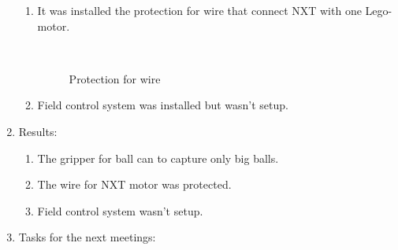 \begin{enumerate}
\begin{enumerate}
		\item It was installed the protection for wire that connect NXT with one Lego-motor.
		\begin{figure}[H] 
			\begin{minipage}[h]{0.2\linewidth}
				\center  
			\end{minipage}
			\begin{minipage}[h]{0.6\linewidth}
				\caption{Protection for wire}
			\end{minipage}
		\end{figure}
		
        \item Field control system was installed but wasn't setup.

	\end{enumerate}
	
	\item Results:
	\begin{enumerate}
		
		\item The gripper for ball can to capture only big balls.
		
		\item The wire for NXT motor was protected.
		
        \item Field control system wasn't setup.
		
	\end{enumerate}
	
	\item Tasks for the next meetings:
	\begin{enumerate}
		

\end{enumerate}
\end{enumerate}
